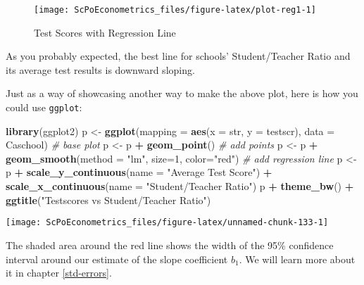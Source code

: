 \documentclass[]{book}
\newenvironment{Shaded}{\begin{snugshade}}{\end{snugshade}}
\newcommand{\KeywordTok}[1]{\textcolor[rgb]{0.13,0.29,0.53}{\textbf{#1}}}
\newcommand{\DataTypeTok}[1]{\textcolor[rgb]{0.13,0.29,0.53}{#1}}
\newcommand{\DecValTok}[1]{\textcolor[rgb]{0.00,0.00,0.81}{#1}}
\newcommand{\StringTok}[1]{\textcolor[rgb]{0.31,0.60,0.02}{#1}}
\newcommand{\CommentTok}[1]{\textcolor[rgb]{0.56,0.35,0.01}{\textit{#1}}}
\newcommand{\OperatorTok}[1]{\textcolor[rgb]{0.81,0.36,0.00}{\textbf{#1}}}
\newcommand{\NormalTok}[1]{#1}
\begin{document}
\begin{figure}

{\centering \texttt{[image: ScPoEconometrics\_files/figure-latex/plot-reg1-1]} 

}

\caption{Test Scores with Regression Line}\label{fig:plot-reg1}
\end{figure}

As you probably expected, the best line for schools' Student/Teacher
Ratio and its average test results is downward sloping.

Just as a way of showcasing another way to make the above plot, here is
how you could use \texttt{ggplot}:

\begin{Shaded}
\begin{Highlighting}[]
\KeywordTok{library}\NormalTok{(ggplot2)}
\NormalTok{p <-}\StringTok{ }\KeywordTok{ggplot}\NormalTok{(}\DataTypeTok{mapping =} \KeywordTok{aes}\NormalTok{(}\DataTypeTok{x =}\NormalTok{ str, }\DataTypeTok{y =}\NormalTok{ testscr), }\DataTypeTok{data =}\NormalTok{ Caschool) }\CommentTok{# base plot}
\NormalTok{p <-}\StringTok{ }\NormalTok{p }\OperatorTok{+}\StringTok{ }\KeywordTok{geom_point}\NormalTok{() }\CommentTok{# add points}
\NormalTok{p <-}\StringTok{ }\NormalTok{p }\OperatorTok{+}\StringTok{ }\KeywordTok{geom_smooth}\NormalTok{(}\DataTypeTok{method =} \StringTok{"lm"}\NormalTok{, }\DataTypeTok{size=}\DecValTok{1}\NormalTok{, }\DataTypeTok{color=}\StringTok{"red"}\NormalTok{) }\CommentTok{# add regression line}
\NormalTok{p <-}\StringTok{ }\NormalTok{p }\OperatorTok{+}\StringTok{ }\KeywordTok{scale_y_continuous}\NormalTok{(}\DataTypeTok{name =} \StringTok{"Average Test Score"}\NormalTok{) }\OperatorTok{+}\StringTok{ }
\StringTok{         }\KeywordTok{scale_x_continuous}\NormalTok{(}\DataTypeTok{name =} \StringTok{"Student/Teacher Ratio"}\NormalTok{)}
\NormalTok{p }\OperatorTok{+}\StringTok{ }\KeywordTok{theme_bw}\NormalTok{() }\OperatorTok{+}\StringTok{ }\KeywordTok{ggtitle}\NormalTok{(}\StringTok{"Testscores vs Student/Teacher Ratio"}\NormalTok{)}
\end{Highlighting}
\end{Shaded}

\begin{center}\texttt{[image: ScPoEconometrics\_files/figure-latex/unnamed-chunk-133-1]} \end{center}

The shaded area around the red line shows the width of the 95\%
confidence interval around our estimate of the slope coefficient
\(b_1\). We will learn more about it in chapter \ref{std-errors}.
\end{document}
